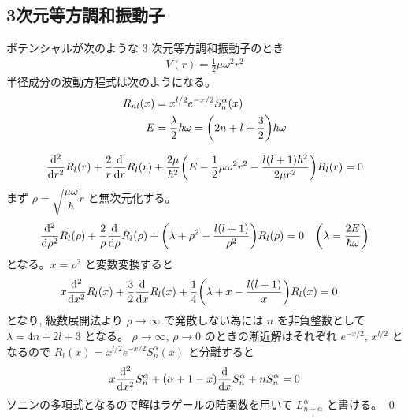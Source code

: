 \documentclass[uplatex,dvipdfmx,a4paper,11pt]{jlreq}
\makeatletter
\numberwithin{equation}{section}
\theoremstyle{definition}
\renewenvironment{proof}[1][\proofname]{\par
  \normalfont
  \topsep6\p@\@plus6\p@ \trivlist
  \item[\hskip\labelsep{\bfseries #1}\@addpunct{\bfseries}]\ignorespaces\quad\par
}{%
  \qed\endtrivlist\@endpefalse
}
\renewcommand\proofname{証明}
\makeatother
\begin{document}
\subsection{3次元等方調和振動子}
\begin{proposition}
  ポテンシャルが次のような 3 次元等方調和振動子のとき
  \begin{align}
    V(r) = \frac{1}{2}\mu\omega^2r^2
  \end{align}
  半径成分の波動方程式は次のようになる。
  \begin{align}
    R_{nl}(x) & = x^{l/2}e^{-x/2}S_n^\alpha(x)                                         \\
    E         & = \frac{\lambda}{2}\hbar\omega = \qty(2n + l + \frac{3}{2})\hbar\omega
  \end{align}
\end{proposition}
\begin{proof}
  \begin{align}
    \dv[2]{r}R_l(r) + \frac{2}{r}\dv{r}R_l(r) + \frac{2\mu}{\hbar^2}\qty(E - \frac{1}{2}\mu\omega^2r^2 - \frac{l(l+1)\hbar^2}{2\mu r^2})R_l(r) = 0
  \end{align}
  まず $\rho = \sqrt{\dfrac{\mu\omega}{\hbar}}r$ と無次元化する。
  \begin{align}
    \dv[2]{\rho}R_l(\rho) + \frac{2}{\rho}\dv{\rho}R_l(\rho) + \qty(\lambda + \rho^2 - \frac{l(l+1)}{\rho^2})R_l(\rho) & = 0 & \qty(\lambda = \frac{2E}{\hbar\omega})
  \end{align}
  となる。$x = \rho^2$ と変数変換すると
  \begin{align}
     & x\dv[2]{x}R_l(x) + \frac{3}{2}\dv{x}R_l(x) + \frac{1}{4}\qty(\lambda + x - \frac{l(l+1)}{x})R_l(x) = 0
  \end{align}
  となり, 級数展開法より $\rho\to\infty$ で発散しない為には $n$ を非負整数として $\lambda = 4n + 2l + 3$ となる。
  $\rho\to\infty$, $\rho\to 0$ のときの漸近解はそれぞれ $e^{-x/2}$, $x^{l/2}$ となるので $R_l(x) = x^{l/2}e^{-x/2}S_n^\alpha(x)$ と分離すると
  \begin{align}
    x\dv[2]{x}S_n^\alpha + (\alpha + 1 - x)\dv{x}S_n^\alpha + nS_n^\alpha = 0
  \end{align}
  ソニンの多項式となるので解はラゲールの陪関数を用いて $L_{n + \alpha}^\alpha$ と書ける。
\end{proof}
\end{document}
